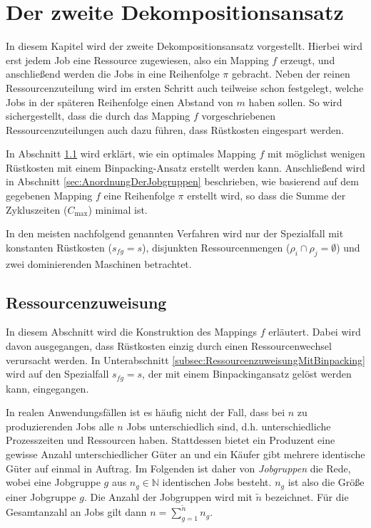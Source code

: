 \documentclass{scrreprt}
\begin{document}
\chapter{Der zweite Dekompositionsansatz}
\label{chap:DerZweiteDekompositionsansatz}
In diesem Kapitel wird der zweite Dekompositionsansatz vorgestellt.
Hierbei wird erst jedem Job eine Ressource zugewiesen, also ein Mapping $f$ erzeugt,
und anschließend werden die Jobs in eine Reihenfolge $\pi$ gebracht.
Neben der reinen Ressourcenzuteilung wird im ersten Schritt auch teilweise schon festgelegt, welche Jobs in der späteren Reihenfolge einen Abstand von $m$ haben sollen.
So wird sichergestellt, dass die durch das Mapping $f$ vorgeschriebenen Ressourcenzuteilungen auch dazu führen, dass Rüstkosten eingespart werden.

In Abschnitt \ref{sec:Ressourcenzuweisung} wird erklärt, wie ein optimales Mapping $f$ mit möglichst wenigen Rüstkosten mit einem Binpacking-Ansatz erstellt werden kann.
Anschließend wird in Abschnitt \ref{sec:AnordnungDerJobgruppen} beschrieben, wie basierend auf dem gegebenen Mapping $f$ eine Reihenfolge $\pi$ erstellt wird,
so dass die Summe der Zykluszeiten ($C_{\max}$) minimal ist.

In den meisten nachfolgend genannten Verfahren wird nur der Spezialfall mit konstanten Rüstkosten ($s_{fg}=s$),
disjunkten Ressourcenmengen ($\rho_i\cap\rho_j=\emptyset$) und zwei dominierenden Maschinen betrachtet.


\section{Ressourcenzuweisung}
\label{sec:Ressourcenzuweisung}
In diesem Abschnitt wird die Konstruktion des Mappings $f$ erläutert.
Dabei wird davon ausgegangen, dass Rüstkosten einzig durch einen Ressourcenwechsel verursacht werden.
In Unterabschnitt \ref{subsec:RessourcenzuweisungMitBinpacking} wird auf den Spezialfall $s_{fg}=s$, der mit einem Binpackingansatz gelöst werden kann,
eingegangen.

In realen Anwendungsfällen ist es häufig nicht der Fall, dass bei $n$ zu produzierenden Jobs alle $n$ Jobs unterschiedlich sind,
d.h. unterschiedliche Prozesszeiten und Ressourcen haben.
Stattdessen bietet ein Produzent eine gewisse Anzahl unterschiedlicher Güter an und ein Käufer gibt mehrere identische Güter auf einmal in Auftrag.
Im Folgenden ist daher von \textit{Jobgruppen} die Rede, wobei eine Jobgruppe $g$ aus $n_g\in\mathbb{N}$ identischen Jobs besteht.
$n_g$ ist also die Größe einer Jobgruppe $g$.
Die Anzahl der Jobgruppen wird mit $\tilde{n}$ bezeichnet.
Für die Gesamtanzahl an Jobs gilt dann $n = \sum_{g=1}^{\tilde{n}} n_g$.
\end{document}
